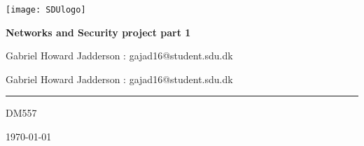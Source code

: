 \begin{titlepage}
	\centering
	\texttt{[image: SDUlogo]}\par\vspace{0.5cm} %
	{\huge\bfseries Networks and Security project part 1\par}
	\vspace{0.5cm}
	{\small Gabriel Howard Jadderson : gajad16@student.sdu.dk\par}
	{\small Gabriel Howard Jadderson : gajad16@student.sdu.dk\par}
  {\rule{10.0cm}{0.1mm}\par}
	{\small DM557\par}
	{\small \today\par}
	\vspace{1cm}
\end{titlepage}

